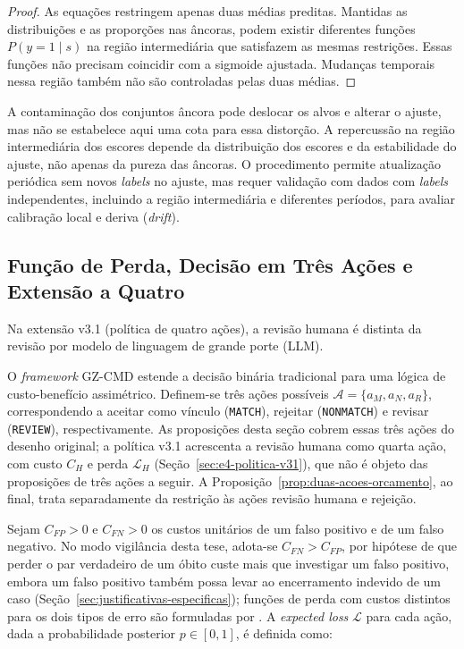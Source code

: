 \begin{proof}
As equações restringem apenas duas médias preditas. Mantidas as distribuições e as proporções nas âncoras, podem existir diferentes funções $P(y=1\mid s)$ na região intermediária que satisfazem as mesmas restrições. Essas funções não precisam coincidir com a sigmoide ajustada. Mudanças temporais nessa região também não são controladas pelas duas médias.
\end{proof}

A contaminação dos conjuntos âncora pode deslocar os alvos e alterar o ajuste, mas não se estabelece aqui uma cota para essa distorção. A repercussão na região intermediária dos escores depende da distribuição dos escores e da estabilidade do ajuste, não apenas da pureza das âncoras. O procedimento permite atualização periódica sem novos \textit{labels} no ajuste, mas requer validação com dados com \textit{labels} independentes, incluindo a região intermediária e diferentes períodos, para avaliar calibração local e deriva (\textit{drift}).

\subsection{Função de Perda, Decisão em Três Ações e Extensão a Quatro}

Na extensão v3.1 (política de quatro ações), a revisão humana é distinta da revisão por modelo de linguagem de grande porte (LLM).

O \textit{framework} GZ-CMD estende a decisão binária tradicional para uma lógica de custo-benefício assimétrico. Definem-se três ações possíveis $\mathcal{A} = \{a_M, a_N, a_R\}$, correspondendo a aceitar como vínculo (\texttt{MATCH}), rejeitar (\texttt{NONMATCH}) e revisar (\texttt{REVIEW}), respectivamente. As proposições desta seção cobrem essas três ações do desenho original; a política v3.1 acrescenta a revisão humana como quarta ação, com custo $C_H$ e perda $\mathcal{L}_H$ (Seção~\ref{sec:e4-politica-v31}), que não é objeto das proposições de três ações a seguir. A Proposição~\ref{prop:duas-acoes-orcamento}, ao final, trata separadamente da restrição às ações revisão humana e rejeição.

Sejam $C_{FP}>0$ e $C_{FN}>0$ os custos unitários de um falso positivo e de um falso negativo. No modo vigilância desta tese, adota-se $C_{FN} > C_{FP}$, por hipótese de que perder o par verdadeiro de um óbito custe mais que investigar um falso positivo, embora um falso positivo também possa levar ao encerramento indevido de um caso (Seção~\ref{sec:justificativas-especificas}); funções de perda com custos distintos para os dois tipos de erro são formuladas por . A \textit{expected loss} $\mathcal{L}$ para cada ação, dada a probabilidade posterior $p\in[0,1]$, é definida como:

